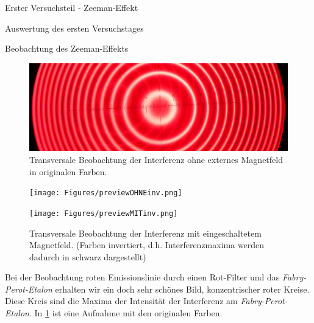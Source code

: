 \documentclass[pdftex, a4paper,11pt, twoside, ngerman]{report}
\begin{document}
\begin{chapter}{Erster Versuchsteil - Zeeman-Effekt}
\begin{section}{Auswertung des ersten Versuchstages}
      \begin{subsection}{Beobachtung des Zeeman-Effekts}
        \label{chp:Zeeman:sec:AuswertungBeobachtung}
        \begin{figure}[t!]
          \centering
          \includegraphics[width=\textwidth]{Figures/previewOHNEcut.jpg}
          \caption{Transversale Beobachtung der Interferenz ohne externes 
                Magnetfeld in originalen Farben.}
          \label{fig:previewOHNE}
        \end{figure}
        \begin{figure}[b!]
          \centering
          \begin{minipage}{0.48\textwidth}
            \centering
            \texttt{[image: Figures/previewOHNEinv.png]}
            \caption{Transversale Beobachtung der Interferenz ohne externes 
                Magnetfeld. (Farben invertiert, d.h. Interferenzmaxima werden 
                dadurch in schwarz dargestellt)}
            \label{fig:previewOHNEinv}
          \end{minipage}\quad
          \begin{minipage}{0.48\textwidth}
            \centering
            \texttt{[image: Figures/previewMITinv.png]}
            \caption{Transversale Beobachtung der Interferenz mit 
                eingeschaltetem Magnetfeld. (Farben invertiert, d.h. 
                Interferenzmaxima werden dadurch in schwarz dargestellt)}
            \label{fig:previewMITinv}
          \end{minipage}
        \end{figure}
        Bei der Beobachtung roten Emissionslinie durch einen Rot-Filter und das
        \textit{Fabry-Perot-Etalon} erhalten wir ein doch sehr schönes Bild,
        konzentrischer roter Kreise. Diese Kreis sind die Maxima der Intensität
        der Interferenz am \textit{Fabry-Perot-Etalon}. In 
        \cref{fig:previewOHNE} ist eine Aufnahme mit den originalen Farben.

\end{subsection}
\end{section}
\end{chapter}
\end{document}
